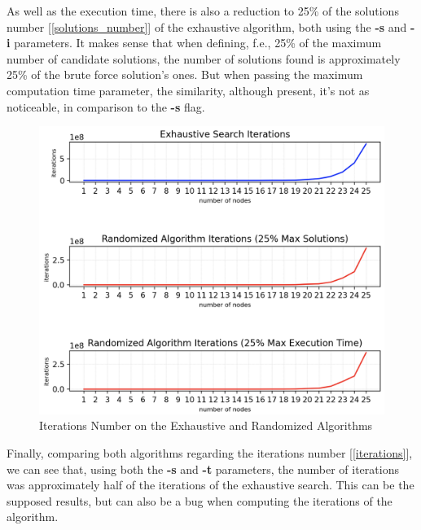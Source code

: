 \documentclass[...]{revdetua}
\begin{document}
As well as the execution time, there is also a reduction to 25\% of the solutions number [\ref{solutions_number}] of the exhaustive algorithm, both using the \textbf{-s} and \textbf{-i} parameters. It makes sense that when defining, f.e., 25\% of the maximum number of candidate solutions, the number of solutions found is approximately 25\% of the brute force solution's ones. But when passing the maximum computation time parameter, the similarity, although present, it's not as noticeable, in comparison to the \textbf{-s} flag.

\begin{figure}[!htbp]
    \centering
    \includegraphics[width=0.9\columnwidth]{./figures/iterations_0.25.png}
    \caption{Iterations Number on the Exhaustive and Randomized Algorithms\label{iterations}}
    \label{fig: Iterations on the Exhaustive and Randomized Algorithms}
\end{figure}

Finally, comparing both algorithms regarding the iterations number [\ref{iterations}], we can see that, using both the \textbf{-s} and \textbf{-t} parameters, the number of iterations was approximately half of the iterations of the exhaustive search. This can be the supposed results, but can also be a bug when computing the iterations of the algorithm.
\end{document}
